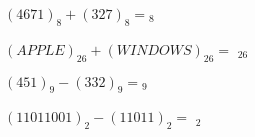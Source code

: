 \documentclass[handout,numbers]{ximera}
\begin{document}
\begin{question} $(4671)_8 + (327)_8 = $\qquad\qquad {}$_8$
\end{question}

\begin{question} $(APPLE)_{26}+(WINDOWS)_{26} = $ \qquad\qquad {}$_{26}$
\end{question}

\begin{question} $(451)_9 - (332)_9 = $\qquad\qquad {}$_9$

\end{question}

\begin{question} $(11011001)_2 - (11011)_2 = $ \qquad\qquad {}$_2$

\end{question}
\end{document}

